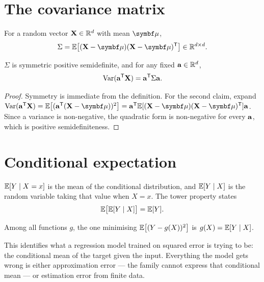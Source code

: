 \section{The covariance matrix}

For a random vector \(\mathbf{X}\in\mathbb{R}^{d}\) with mean \(\vgreek{\mu}\),
\[
	\Sigma=\E\bigl[(\vect{X}-\vgreek{\mu})(\vect{X}-\vgreek{\mu})\tp\bigr]\in\R^{d\times d}.
\]

\begin{proposition}
\(\Sigma\) is symmetric positive semidefinite, and for any fixed
\(\mathbf{a}\in\mathbb{R}^{d}\),
\[
	\operatorname{Var}(\mathbf{a}^{\mathsf{T}}\mathbf{X})=\mathbf{a}^{\mathsf{T}}\Sigma\mathbf{a}.
\]
\end{proposition}

\begin{proof}
Symmetry is immediate from the definition. For the second claim, expand
\(\Var(\vect{a}\tp\vect{X})
=\E\bigl[(\vect{a}\tp(\vect{X}-\vgreek{\mu}))^{2}\bigr]
=\vect{a}\tp\E[(\vect{X}-\vgreek{\mu})(\vect{X}-\vgreek{\mu})\tp]\vect{a}\).
Since a variance is non-negative, the quadratic form is non-negative for every
\(\mathbf{a}\), which is positive semidefiniteness.
\end{proof}


\section{Conditional expectation}

\(\mathbb{E}[Y\mid X=x]\) is the mean of the conditional distribution, and
\(\mathbb{E}[Y\mid X]\) is the random variable taking that value when \(X=x\). The tower
property states
\[
	\mathbb{E}\bigl[\mathbb{E}[Y\mid X]\bigr]=\mathbb{E}[Y].
\]

\begin{proposition}
Among all functions \(g\), the one minimising \(\mathbb{E}\bigl[(Y-g(X))^{2}\bigr]\) is
\(g(X)=\mathbb{E}[Y\mid X]\).
\end{proposition}

\begin{remark}
This identifies what a regression model trained on squared error is trying to
be: the conditional mean of the target given the input. Everything the model
gets wrong is either approximation error --- the family cannot express that
conditional mean --- or estimation error from finite data.
\end{remark}
